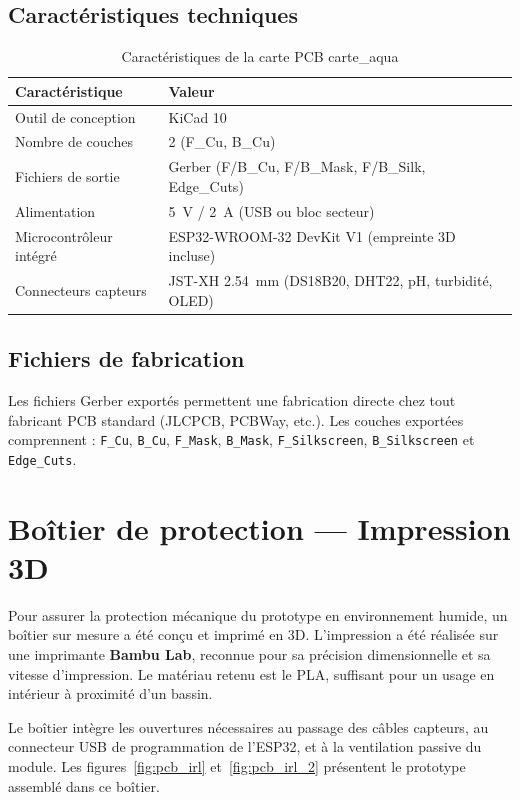 \documentclass[12pt,a4paper]{report}
\newcommand{\code}[1]{\texttt{\small\colorbox{codebg}{#1}}}
\begin{document}
\subsection{Caractéristiques techniques}

\begin{table}[H]
\centering
\caption{Caractéristiques de la carte PCB carte\_aqua}
\label{tab:pcb}
\begin{tabularx}{\textwidth}{@{}L{5cm}L{9cm}@{}}
\toprule
\textbf{Caractéristique} & \textbf{Valeur} \\
\midrule
Outil de conception & KiCad 10 \\
Nombre de couches & 2 (F\_Cu, B\_Cu) \\
Fichiers de sortie & Gerber (F/B\_Cu, F/B\_Mask, F/B\_Silk, Edge\_Cuts) \\
Alimentation & 5~V / 2~A (USB ou bloc secteur) \\
Microcontrôleur intégré & ESP32-WROOM-32 DevKit V1 (empreinte 3D incluse) \\
Connecteurs capteurs & JST-XH 2.54~mm (DS18B20, DHT22, pH, turbidité, OLED) \\
\bottomrule
\end{tabularx}
\end{table}

\subsection{Fichiers de fabrication}

Les fichiers Gerber exportés permettent une fabrication directe chez tout fabricant PCB
standard (JLCPCB, PCBWay, etc.). Les couches exportées comprennent :
\code{F\_Cu}, \code{B\_Cu}, \code{F\_Mask}, \code{B\_Mask}, \code{F\_Silkscreen},
\code{B\_Silkscreen} et \code{Edge\_Cuts}.

\section{Boîtier de protection --- Impression 3D}

Pour assurer la protection mécanique du prototype en environnement humide,
un boîtier sur mesure a été conçu et imprimé en 3D. L'impression a été
réalisée sur une imprimante \textbf{Bambu Lab}, reconnue pour sa précision
dimensionnelle et sa vitesse d'impression. Le matériau retenu est le PLA,
suffisant pour un usage en intérieur à proximité d'un bassin.

Le boîtier intègre les ouvertures nécessaires au passage des câbles capteurs,
au connecteur USB de programmation de l'ESP32, et à la ventilation passive
du module. Les figures~\ref{fig:pcb_irl} et~\ref{fig:pcb_irl_2} présentent
le prototype assemblé dans ce boîtier.
\end{document}
